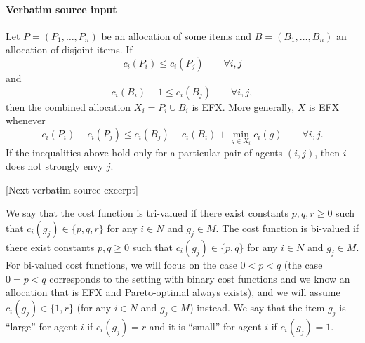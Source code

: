 \documentclass[10pt]{article}
\begin{document}
\paragraph{Verbatim source input}
\begin{ReviewVerbatim}
\begin{lemma}[Composition]\label{lem:composition}
Let $P=(P_1,\ldots,P_n)$ be an allocation of some items and $B=(B_1,\ldots,B_n)$ an allocation of disjoint
items.  If
\[
 c_i(P_i)\le c_i(P_j)\qquad\forall i,j
\]
and
\[
 c_i(B_i)-1\le c_i(B_j)\qquad\forall i,j,
\]
then the combined allocation $X_i=P_i\cup B_i$ is EFX. %
More generally, $X$ is EFX whenever
\[
 c_i(P_i)-c_i(P_j)
 \le c_i(B_j)-c_i(B_i)+\min_{g\in X_i}c_i(g)
 \qquad\forall i,j.
\]
If the inequalities above hold only for a particular pair of agents $(i,j)$, then $i$ does not strongly envy $j$.
\end{lemma}

[Next verbatim source excerpt]

We say that the cost function is tri-valued if there exist constants $p,q,r\geq 0$ such that $c_i(g_j)\in\{p,q,r\}$ for any $i\in N$ and $g_j\in M$.
The cost function is bi-valued if there exist constants $p,q\geq 0$ such that $c_i(g_j)\in\{p,q\}$ for any $i\in N$ and $g_j\in M$.
For bi-valued cost functions, we will focus on the case $0<p<q$ (the case $0=p<q$ corresponds to the setting with binary cost functions and we know an allocation that is EFX and Pareto-optimal always exists), and we will assume $c_i(g_j)\in\{1,r\}$ (for any $i\in N$ and $g_j\in M$) instead.
We say that the item $g_j$ is ``large'' for agent $i$ if $c_i(g_j)=r$ and it is ``small'' for agent $i$ if $c_i(g_j)=1$.
\end{ReviewVerbatim}
\end{document}
